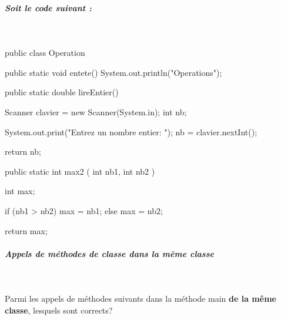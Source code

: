 \documentclass[11pt,a4paper]{article}
\begin{document}
		\subparagraph{Soit le code suivant :  } 
		
					\textcolor{white}{.} \par
				\begin{Java}
public class Operation {

	public static void entete() {
		System.out.println("Operations");
	}
  
	public static double lireEntier() {  
	
		Scanner clavier = new Scanner(System.in);
		int nb;
		
		System.out.print("Entrez un nombre entier: ");
		nb = clavier.nextInt();
		
		return nb;  
	}  
	
	public static int max2 ( int nb1, int nb2 ) { 
	 
		int max;
		
		if (nb1 > nb2) {
			max = nb1;
		} else {
			max = nb2;
		}
		
		return max;  
	}   
	 
}				\end{Java}
            \par
        
			
		\subparagraph{Appels de m\'ethodes de classe dans la m\^eme classe} 
		
                \textcolor{white}{.} \par
            
              Parmi les appels de m\'ethodes suivants dans la m\'ethode main \textbf{de la m\^eme classe}, lesquels sont corrects?  
            
\end{document}
